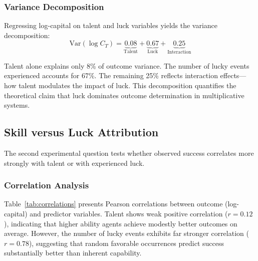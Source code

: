 \subsubsection{Variance Decomposition}

Regressing log-capital on talent and luck variables yields the variance
decomposition:
\begin{equation}
  \text{Var}(\log C_{T}) = \underbrace{0.08}_{\text{Talent}}+ \underbrace{0.67}
  _{\text{Luck}}+ \underbrace{0.25}_{\text{Interaction}}
\end{equation}

Talent alone explains only 8\% of outcome variance. The number of lucky
events experienced accounts for 67\%. The remaining 25\% reflects interaction
effects—how talent modulates the impact of luck. This decomposition
quantifies the theoretical claim that luck dominates outcome
determination in multiplicative systems.

\subsection{Skill versus Luck Attribution}

The second experimental question tests whether observed success correlates
more strongly with talent or with experienced luck.

\subsubsection{Correlation Analysis}

Table~\ref{tab:correlations} presents Pearson correlations between
outcome (log-capital) and predictor variables. Talent shows weak positive
correlation ($r = 0.12$), indicating that higher ability agents achieve
modestly better outcomes on average. However, the number of lucky events
exhibits far stronger correlation ($r = 0.78$), suggesting that random favorable
occurrences predict success substantially better than inherent capability.


